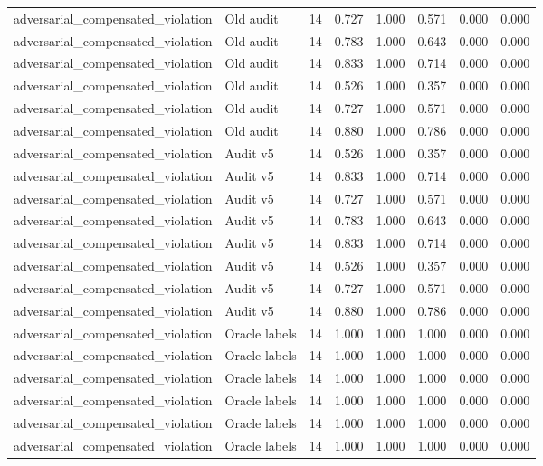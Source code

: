 {\begin{longtable}{llrrrrrr}
adversarial\_compensated\_violation & Old audit & 14 & 0.727 & 1.000 & 0.571 & 0.000 & 0.000 \\
adversarial\_compensated\_violation & Old audit & 14 & 0.783 & 1.000 & 0.643 & 0.000 & 0.000 \\
adversarial\_compensated\_violation & Old audit & 14 & 0.833 & 1.000 & 0.714 & 0.000 & 0.000 \\
adversarial\_compensated\_violation & Old audit & 14 & 0.526 & 1.000 & 0.357 & 0.000 & 0.000 \\
adversarial\_compensated\_violation & Old audit & 14 & 0.727 & 1.000 & 0.571 & 0.000 & 0.000 \\
adversarial\_compensated\_violation & Old audit & 14 & 0.880 & 1.000 & 0.786 & 0.000 & 0.000 \\
adversarial\_compensated\_violation & Audit v5 & 14 & 0.526 & 1.000 & 0.357 & 0.000 & 0.000 \\
adversarial\_compensated\_violation & Audit v5 & 14 & 0.833 & 1.000 & 0.714 & 0.000 & 0.000 \\
adversarial\_compensated\_violation & Audit v5 & 14 & 0.727 & 1.000 & 0.571 & 0.000 & 0.000 \\
adversarial\_compensated\_violation & Audit v5 & 14 & 0.783 & 1.000 & 0.643 & 0.000 & 0.000 \\
adversarial\_compensated\_violation & Audit v5 & 14 & 0.833 & 1.000 & 0.714 & 0.000 & 0.000 \\
adversarial\_compensated\_violation & Audit v5 & 14 & 0.526 & 1.000 & 0.357 & 0.000 & 0.000 \\
adversarial\_compensated\_violation & Audit v5 & 14 & 0.727 & 1.000 & 0.571 & 0.000 & 0.000 \\
adversarial\_compensated\_violation & Audit v5 & 14 & 0.880 & 1.000 & 0.786 & 0.000 & 0.000 \\
adversarial\_compensated\_violation & Oracle labels & 14 & 1.000 & 1.000 & 1.000 & 0.000 & 0.000 \\
adversarial\_compensated\_violation & Oracle labels & 14 & 1.000 & 1.000 & 1.000 & 0.000 & 0.000 \\
adversarial\_compensated\_violation & Oracle labels & 14 & 1.000 & 1.000 & 1.000 & 0.000 & 0.000 \\
adversarial\_compensated\_violation & Oracle labels & 14 & 1.000 & 1.000 & 1.000 & 0.000 & 0.000 \\
adversarial\_compensated\_violation & Oracle labels & 14 & 1.000 & 1.000 & 1.000 & 0.000 & 0.000 \\
adversarial\_compensated\_violation & Oracle labels & 14 & 1.000 & 1.000 & 1.000 & 0.000 & 0.000 \\

\end{longtable}}

